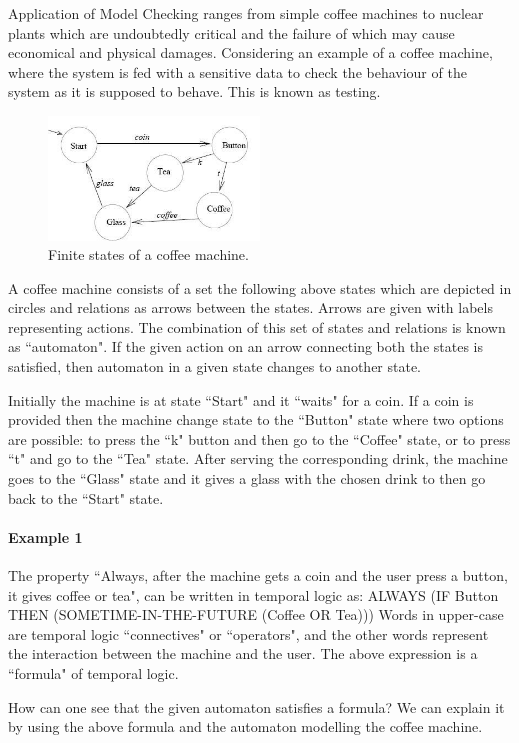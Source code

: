 \documentclass[a4paper,10pt]{report}
\begin{document}
Application of Model Checking ranges from simple coffee machines to nuclear plants which are undoubtedly critical and the failure of which may cause economical and physical damages. Considering an example of a coffee machine, where the system is fed with a sensitive data to check the behaviour of the system as it is supposed to behave. This is known as testing. 
\begin{figure}[h!]
\centering
 \includegraphics[width= 0.5\textwidth]{flower.png}
\caption{Finite states of a coffee machine.}
\end{figure}
 A coffee machine consists of a set the following above states which are depicted in circles and relations as arrows between the states. Arrows are given with labels representing actions. The combination of this set of states and relations is known as ``automaton". If the given action on an arrow connecting both the states is satisfied, then automaton in a given state changes to another state. 
 
Initially the machine is at state ``Start" and it ``waits" for a coin. If a coin is provided then the machine change state to the ``Button" state where two options are possible: to press the ``k" button and then go to the ``Coffee" state, or to press ``t" and go to the ``Tea" state. After serving the corresponding drink, the machine goes to the ``Glass" state and it gives a glass with the chosen drink to then go back to the ``Start" state.
\paragraph{Example 1}
The property ``Always, after the machine gets a coin and the user press a button, it gives coffee or tea", can be written in temporal logic as:
ALWAYS (IF Button THEN (SOMETIME-IN-THE-FUTURE (Coffee OR Tea)))
Words in upper-case are temporal logic ``connectives" or ``operators", and the other words represent the interaction between the machine and the user. The above expression is a ``formula" of temporal logic.

How can one see that the given automaton satisfies a formula? We can explain it by using the above formula and the automaton modelling the coffee machine.
\end{document}
